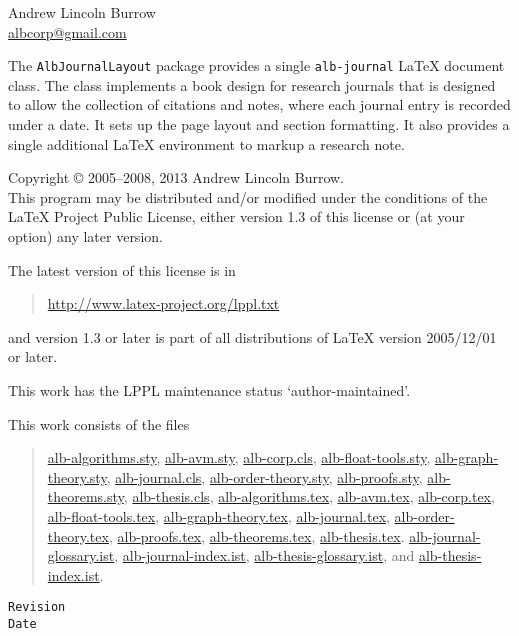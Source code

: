 \documentclass[11pt,a4paper,oneside,titlepage]{alb-corp}
\begin{document}



\begin{albTitlePage}


  Andrew Lincoln Burrow\\
  \url{albcorp@gmail.com}



  The \texttt{AlbJournalLayout} package provides a single
  \texttt{alb-journal} \LaTeX{} document class.  The class implements a
  book design for research journals that is designed to allow the
  collection of citations and notes, where each journal entry is
  recorded under a date.  It sets up the page layout and section
  formatting.  It also provides a single additional \LaTeX{} environment
  to markup a research note.



  Copyright \copyright{} 2005--2008, 2013 Andrew Lincoln Burrow.\\
  This program may be distributed and/or modified under the conditions
  of the \LaTeX{} Project Public License, either version 1.3 of this
  license or (at your option) any later version.

  \medskip{}

  The latest version of this license is in
  \begin{quote}
    \url{http://www.latex-project.org/lppl.txt}
  \end{quote}
  and version 1.3 or later is part of all distributions of LaTeX version
  2005/12/01 or later.

  \medskip{}

  This work has the LPPL maintenance status `author-maintained'.

  \medskip{}

  This work consists of the files
  \begin{quote}
    \begin{flushleft}
      \url{alb-algorithms.sty}, \url{alb-avm.sty}, \url{alb-corp.cls},
      \url{alb-float-tools.sty}, \url{alb-graph-theory.sty},
      \url{alb-journal.cls}, \url{alb-order-theory.sty},
      \url{alb-proofs.sty}, \url{alb-theorems.sty},
      \url{alb-thesis.cls}, \url{alb-algorithms.tex}, \url{alb-avm.tex},
      \url{alb-corp.tex}, \url{alb-float-tools.tex},
      \url{alb-graph-theory.tex}, \url{alb-journal.tex},
      \url{alb-order-theory.tex}, \url{alb-proofs.tex},
      \url{alb-theorems.tex}, \url{alb-thesis.tex}.
      \url{alb-journal-glossary.ist}, \url{alb-journal-index.ist},
      \url{alb-thesis-glossary.ist}, and \url{alb-thesis-index.ist}.
    \end{flushleft}
  \end{quote}



  \verb$Revision$\\
  \verb$Date$

\end{albTitlePage}
\end{document}
